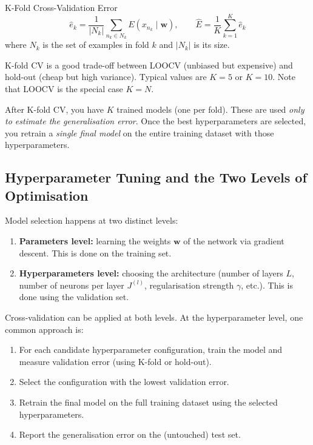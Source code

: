 \documentclass[11pt,a4paper]{article}
\begin{document}
\begin{defbox}{K-Fold Cross-Validation Error}
\[
\hat{e}_k = \frac{1}{|N_k|}\sum_{n_k \in N_k} E(x_{n_k} \mid \mathbf{w}),
\qquad
\hat{E} = \frac{1}{K}\sum_{k=1}^K \hat{e}_k
\]
where $N_k$ is the set of examples in fold $k$ and $|N_k|$ is its size.
\end{defbox}

K-fold CV is a good trade-off between LOOCV (unbiased but expensive) and hold-out (cheap but high variance). Typical values are $K = 5$ or $K = 10$. Note that LOOCV is the special case $K = N$.

\begin{insightbox}
After K-fold CV, you have $K$ trained models (one per fold). These are used \emph{only to estimate the generalisation error}. Once the best hyperparameters are selected, you retrain a \emph{single final model} on the entire training dataset with those hyperparameters.
\end{insightbox}

\subsection{Hyperparameter Tuning and the Two Levels of Optimisation}

Model selection happens at two distinct levels:

\begin{enumerate}
  \item \textbf{Parameters level:} learning the weights $\mathbf{w}$ of the network via gradient descent. This is done on the training set.
  \item \textbf{Hyperparameters level:} choosing the architecture (number of layers $L$, number of neurons per layer $J^{(l)}$, regularisation strength $\gamma$, etc.). This is done using the validation set.
\end{enumerate}

Cross-validation can be applied at both levels. At the hyperparameter level, one common approach is:
\begin{enumerate}
  \item For each candidate hyperparameter configuration, train the model and measure validation error (using K-fold or hold-out).
  \item Select the configuration with the lowest validation error.
  \item Retrain the final model on the full training dataset using the selected hyperparameters.
  \item Report the generalisation error on the (untouched) test set.
\end{enumerate}
\end{document}
